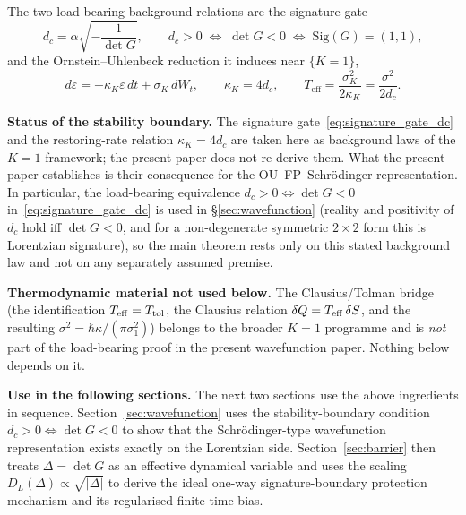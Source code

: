 \documentclass[11pt,a4paper]{article}
\theoremstyle{definition}
\begin{document}
\noindent The two load-bearing background relations are the signature gate
\begin{equation}
d_c=\alpha\sqrt{-\frac{1}{\det G}},
\qquad
d_c>0
\;\Longleftrightarrow\;
\det G<0
\;\Longleftrightarrow\;
\mathrm{Sig}(G)=(1,1),
\label{eq:signature_gate_dc}
\end{equation}
and the Ornstein--Uhlenbeck reduction it induces near $\{K{=}1\}$,
\begin{equation}
d\varepsilon
=
-\kappa_K\varepsilon\,dt+\sigma_K\,dW_t,
\qquad
\kappa_K=4d_c,
\qquad
T_{\mathrm{eff}}
=
\frac{\sigma_K^2}{2\kappa_K}
=
\frac{\sigma^2}{2d_c}.
\label{eq:ou_reduction}
\end{equation}

\medskip\noindent
\textbf{Status of the stability boundary.}
The signature gate~\eqref{eq:signature_gate_dc} and the
restoring-rate relation $\kappa_K=4d_c$ are taken here as background laws
of the $K{=}1$ framework; the present paper does not re-derive them. What
the present paper establishes is their consequence for the
OU--FP--Schr\"odinger representation. In particular, the load-bearing
equivalence $d_c>0\Leftrightarrow\det G<0$ in~\eqref{eq:signature_gate_dc}
is used in \S\ref{sec:wavefunction}
(reality and positivity of $d_c$ hold iff $\det G<0$, and for a
non-degenerate symmetric $2\times2$ form this is Lorentzian signature),
so the main theorem rests only on this stated background law and not on
any separately assumed premise.

\medskip\noindent
\textbf{Thermodynamic material not used below.}
The Clausius/Tolman bridge (the identification $T_{\rm eff}=T_{\rm tol}$,
the Clausius relation $\delta Q=T_{\rm eff}\,\delta S$, and the resulting
$\sigma^2=\hbar\kappa/(\pi\sigma_1^2)$) belongs to the broader $K{=}1$
programme and is \emph{not} part of the load-bearing proof in the present
wavefunction paper. Nothing below depends on it.

\medskip\noindent
\textbf{Use in the following sections.}
The next two sections use the above ingredients in sequence.
Section~\ref{sec:wavefunction} uses the stability-boundary condition
$d_c>0\Leftrightarrow\det G<0$ to show that the
Schr\"odinger-type wavefunction representation exists exactly on the
Lorentzian side. Section~\ref{sec:barrier} then treats
$\Delta=\det G$ as an effective dynamical variable and uses the
scaling $D_L(\Delta)\propto\sqrt{|\Delta|}$ to derive the ideal
one-way signature-boundary protection mechanism and its regularised
finite-time bias.

\end{document}
